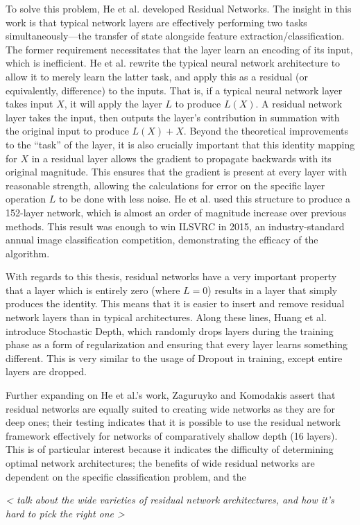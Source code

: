 To solve this problem, He et al. \cite{he2016deep} developed Residual Networks.
The insight in this work is that typical network layers are effectively performing two tasks simultaneously---the transfer of state alongside feature extraction/classification.
The former requirement necessitates that the layer learn an encoding of its input, which is inefficient.
He et al. rewrite the typical neural network architecture to allow it to merely learn the latter task, and apply this as a residual (or equivalently, difference) to the inputs.
That is, if a typical neural network layer takes input $X$, it will apply the layer $L$ to produce $L(X)$.
A residual network layer takes the input, then outputs the layer's contribution in summation with the original input to produce $L(X) + X$.
Beyond the theoretical improvements to the ``task'' of the layer, it is also crucially important that this identity mapping for $X$ in a residual layer allows the gradient to propagate backwards with its original magnitude.
This ensures that the gradient is present at every layer with reasonable strength, allowing the calculations for error on the specific layer operation $L$ to be done with less noise.
He et al. used this structure to produce a 152-layer network, which is almost an order of magnitude increase over previous methods. 
This result was enough to win ILSVRC in 2015, an industry-standard annual image classification competition, demonstrating the efficacy of the algorithm.

With regards to this thesis, residual networks have a very important property that a layer which is entirely zero (where $L = 0$) results in a layer that simply produces the identity.
This means that it is easier to insert and remove residual network layers than in typical architectures.
Along these lines, Huang et al. \cite{huang2016deep} introduce Stochastic Depth, which randomly drops layers during the training phase as a form of regularization and ensuring that every layer learns something different.
This is very similar to the usage of Dropout in training, except entire layers are dropped.

Further expanding on He et al.'s work, Zaguruyko and Komodakis \cite{zagoruyko2016wide} assert that residual networks are equally suited to creating wide networks as they are for deep ones; their testing indicates that it is possible to use the residual network framework effectively for networks of comparatively shallow depth (16 layers).
This is of particular interest because it indicates the difficulty of determining optimal network architectures; the benefits of wide residual networks are dependent on the specific classification problem, and the 

\emph{ < talk about the wide varieties of residual network architectures, and how it's hard to pick the right one > }
 
